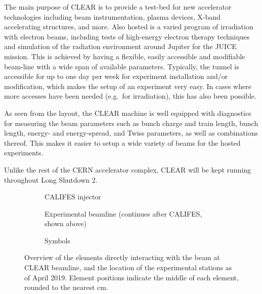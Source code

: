 \documentclass[a4paper,
               keeplastbox,   %
               ]{jacow}
\begin{document}
The main purpose of CLEAR is to provide a test-bed for new accelerator technologies including beam instrumentation, plasma devices, X-band accelerating structures, and more.
Also hosted is a varied program of irradiation with electron beams, including tests of high-energy electron therapy techniques and simulation of the radiation environment around Jupiter for the JUICE mission.
This is achieved by having a flexible, easily accessible and modifiable beam-line with a wide span of available parameters.
Typically, the tunnel is accessible for up to one day per week for experiment installation and/or modification, which makes the setup of an experiment very easy.
In cases where more accesses have been needed (e.g.\ for irradiation), this has also been possible.

As seen from the layout, the CLEAR machine is well equipped with diagnostics for measuring the beam parameters such as bunch charge and train length, bunch length, energy- and energy-spread, and Twiss parameters, as well as combinations thereof.
This makes it easier to setup a wide variety of beams for the hosted experiments.

Unlike the rest of the CERN accelerator complex, CLEAR will be kept running throughout Long Shutdown 2.


\begin{figure}
    \centering
    \begin{subfigure}[h]{\textwidth}
        \centering
        
        \vspace{-2em} %
        \caption{CALIFES injector}
    \end{subfigure}
    \begin{subfigure}[h]{\textwidth}
        \centering
        \vspace{-1em}
        
        \vspace{-0.5em}
        \caption{Experimental beamline
        (continues after CALIFES, shown above)}
    \end{subfigure}
    \begin{subfigure}[h]{\textwidth}
        \centering
        
        \vspace{-2em} %
        \caption{Symbols}
    \end{subfigure}
    \caption{Overview of the elements directly interacting with the beam at CLEAR beamline, and the location of the experimental stations as of April 2019. Element positions indicate the middle of each element, rounded to the nearest cm.}
    \label{fig:layout}
\end{figure}
\end{document}

